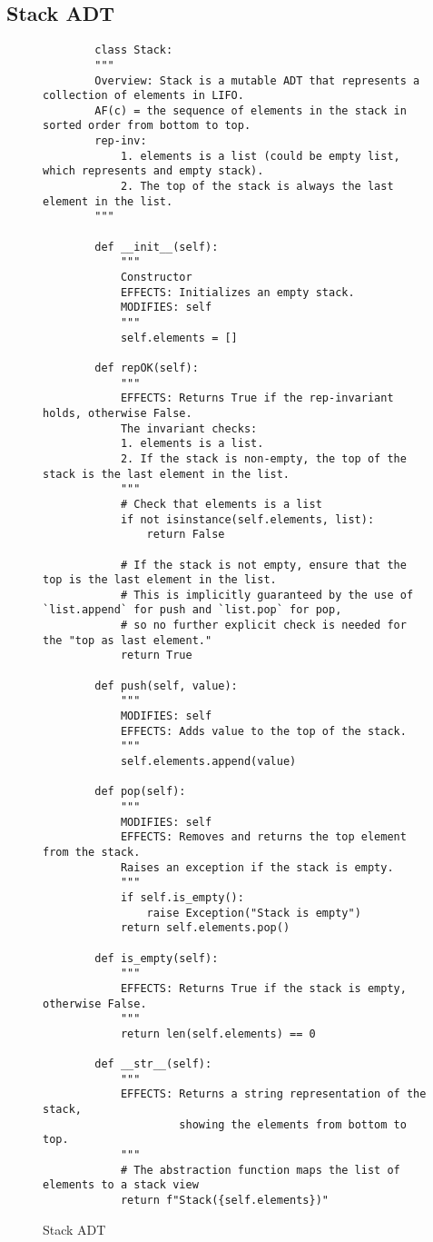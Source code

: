 \documentclass[oneside,11pt,dvipsnames]{book}
\begin{document}
\subsection{Stack ADT}
\begin{figure}
    \begin{lstlisting}
        class Stack:
        """
        Overview: Stack is a mutable ADT that represents a collection of elements in LIFO.
        AF(c) = the sequence of elements in the stack in sorted order from bottom to top.
        rep-inv: 
            1. elements is a list (could be empty list, which represents and empty stack).
            2. The top of the stack is always the last element in the list.
        """
    
        def __init__(self):
            """
            Constructor
            EFFECTS: Initializes an empty stack.
            MODIFIES: self
            """
            self.elements = []
    
        def repOK(self):
            """
            EFFECTS: Returns True if the rep-invariant holds, otherwise False.
            The invariant checks:
            1. elements is a list.
            2. If the stack is non-empty, the top of the stack is the last element in the list.
            """
            # Check that elements is a list
            if not isinstance(self.elements, list):
                return False
            
            # If the stack is not empty, ensure that the top is the last element in the list.
            # This is implicitly guaranteed by the use of `list.append` for push and `list.pop` for pop,
            # so no further explicit check is needed for the "top as last element."
            return True
    
        def push(self, value):
            """
            MODIFIES: self
            EFFECTS: Adds value to the top of the stack.
            """
            self.elements.append(value)
    
        def pop(self):
            """
            MODIFIES: self
            EFFECTS: Removes and returns the top element from the stack. 
            Raises an exception if the stack is empty.
            """
            if self.is_empty():
                raise Exception("Stack is empty")
            return self.elements.pop()
    
        def is_empty(self):
            """
            EFFECTS: Returns True if the stack is empty, otherwise False.
            """
            return len(self.elements) == 0
    
        def __str__(self):
            """
            EFFECTS: Returns a string representation of the stack,
                     showing the elements from bottom to top.
            """
            # The abstraction function maps the list of elements to a stack view
            return f"Stack({self.elements})"
    \end{lstlisting}
    \caption{Stack ADT}\label{ex:stack}
\end{figure}
    
\end{document}
